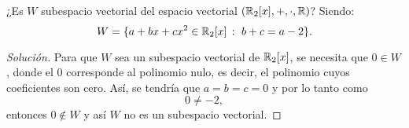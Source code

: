 \documentclass[a4,11pt]{aleph-notas}
\begin{document}
\begin{ejer}
    ¿Es $W$ subespacio vectorial del espacio vectorial $(\mathbb{R}_2[x], + , \cdot, \mathbb{R})$? Siendo: 
    \[W = \{ a + bx + cx^2 \in \mathbb{R}_2[x]\,:\, \, b + c = a - 2 \}.\]
\end{ejer}

\begin{proof}[Solución]\hspace{0pt}
    Para que $W$ sea un subespacio vectorial de $\mathbb{R}_2[x]$, se necesita que $0\in W$, donde el $0$ corresponde al polinomio nulo, es decir, el polinomio cuyos coeficientes son cero. Así, se tendría que $a=b=c=0$ y por lo tanto como
    \[
         0 \neq -2,
    \]
    entonces $0\notin W$ y así $W$ no es un subespacio vectorial. 
\end{proof}
\end{document}
